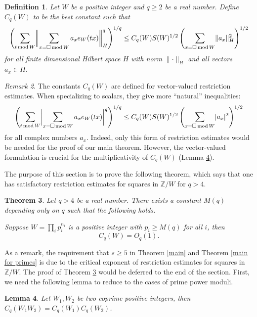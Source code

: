 \documentclass[11pt]{amsart}
\theoremstyle{plain} %
\newtheorem{thm}{Theorem}[section]
\newtheorem{lem}[thm]{Lemma}
\newtheorem{defn}[thm]{Definition}
\theoremstyle{remark}
\newtheorem{rem}[thm]{Remark}
\numberwithin{equation}{section}
\newcommand{\Z}{\mathbb{Z}}
\DeclarePairedDelimiter\abs{\lvert}{\rvert}
\DeclarePairedDelimiter\norm{\lVert}{\rVert}
\newcommand{\sqw}[1]{\sum_{#1=\square\,\mathrm{mod}\,W}}
\newcommand{\aw}[1]{\sum_{#1\,\mathrm{mod}\,W}}
\begin{document}
\begin{defn}
    Let $W$ be a positive integer and $q\geq 2$ be a real number. Define $C_q(W)$ to be the best constant such that
    \begin{equation*}
        \left(\aw{t}\norm[\bigg]{\sqw{x} a_x e_W(tx)}^q_H\right)^{1/q}\leq C_q(W) S(W)^{1/2} \left(\sqw{x}\norm{a_x}^2_H\right)^{1/2}
    \end{equation*}
    for all finite dimensional Hilbert space $H$ with norm $\lVert\cdot\rVert_H$ and all vectors $a_x\in H$.
\end{defn}

\begin{rem}
    The constants $C_q(W)$ are defined for vector-valued restriction estimates. When specializing to scalars, they give more ``natural'' inequalities:
    \begin{equation*}
        \left(\aw{t}\abs[\bigg]{\sqw{x} a_x e_W(tx)}^q\right)^{1/q}\leq C_q(W) S(W)^{1/2} \left(\sqw{x}\abs{a_x}^2\right)^{1/2}
    \end{equation*}
    for all complex numbers $a_x$. Indeed, only this form of restriction estimates would be needed for the proof of our main theorem. However, the vector-valued formulation is crucial for the multiplicativity of $C_q(W)$ (Lemma \ref{multiplicativity}).
\end{rem}

The purpose of this section is to prove the following theorem, which says that one has satisfactory restriction estimates for squares in $\Z/W$ for $q>4$.

\begin{thm}\label{restriction for W}
    Let $q>4$ be a real number. There exists a constant $M(q)$ depending only on $q$ such that the following holds.
    
    Suppose $W=\prod_i p_i^{n_i}$ is a positive integer with $p_i\geq M(q)$ for all $i$, then 
    \begin{equation*}
        C_q(W)=O_q(1).
    \end{equation*}
\end{thm}

As a remark, the requirement that $s\geq 5$ in Theorem \ref{main} and Theorem \ref{main for primes} is due to the critical exponent of restriction estimates for squares in $\Z/W$. The proof of Theorem \ref{restriction for W} would be deferred to the end of the section. First, we need the following lemma to reduce to the cases of prime power moduli.

\begin{lem}\label{multiplicativity}
    Let $W_1,W_2$ be two coprime positive integers, then $C_q(W_1W_2)=C_q(W_1)C_q(W_2)$.
\end{lem}
\end{document}
